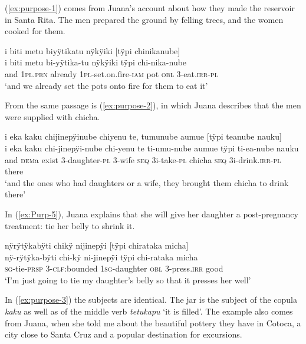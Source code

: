 (\ref{ex:purpose-1}) comes from Juana’s account about how they made the reservoir in Santa Rita. The men prepared the ground by felling trees, and the women cooked for them.

\ea\label{ex:purpose-1}
\begingl
\glpreamble i biti metu biyÿtikatu nÿkÿiki \textup{[}tÿpi chinikanube\textup{]}\\
\gla i biti metu bi-yÿtika-tu nÿkÿiki tÿpi chi-nika-nube\\
\glb and 1\textsc{pl.prn} already 1\textsc{pl}-set.on.fire-\textsc{iam} pot \textsc{obl} 3-eat.\textsc{irr}-\textsc{pl}\\
\glft ‘and we already set the pots onto fire for them to eat it’
\endgl
\trailingcitation{[jxx-p120515l-2.185-186]}
\xe

From the same passage is (\ref{ex:purpose-2}), in which Juana describes that the men were supplied with chicha.

\ea\label{ex:purpose-2}
\begingl
\glpreamble i eka kaku chijinepÿinube chiyenu te, tumunube aumue \textup{[}tÿpi teanube nauku\textup{]}\\
\gla i eka kaku chi-jinepÿi-nube chi-yenu te ti-umu-nube aumue tÿpi ti-ea-nube nauku\\
\glb and \textsc{dem}a exist 3-daughter-\textsc{pl} 3-wife \textsc{seq} 3i-take-\textsc{pl} chicha \textsc{seq} 3i-drink.\textsc{irr}-\textsc{pl} there\\
\glft ‘and the ones who had daughters or a wife, they brought them chicha to drink there’
\endgl
\trailingcitation{[jxx-p120515l-2.182-184]}
\xe

In (\ref{ex:Purp-5}), Juana explains that she will give her daughter a post-pregnancy treatment: tie her belly to shrink it.

\ea\label{ex:Purp-5}
\begingl
\glpreamble nÿrÿtÿkabÿti chikÿ nijinepÿi \textup{[}tÿpi chirataka micha\textup{]}\\
\gla nÿ-rÿtÿka-bÿti chi-kÿ ni-jinepÿi tÿpi chi-rataka micha\\
\textsc{sg}-tie-\textsc{prsp} 3-\textsc{clf:}bounded 1\textsc{sg}-daughter \textsc{obl} 3-press.\textsc{irr} good\\
\glft ‘I’m just going to tie my daughter’s belly so that it presses her well’
\endgl
\trailingcitation{[jxx-e120430l-2.1-2]}
\xe

In (\ref{ex:purpose-3}) the subjects are identical. The jar is the subject of the copula \textit{kaku} as well as of the middle verb \textit{tetukapu} ‘it is filled’. The example also comes from Juana, when she told me about the beautiful pottery they have in Cotoca, a city close to Santa Cruz and a popular destination for excursions.

